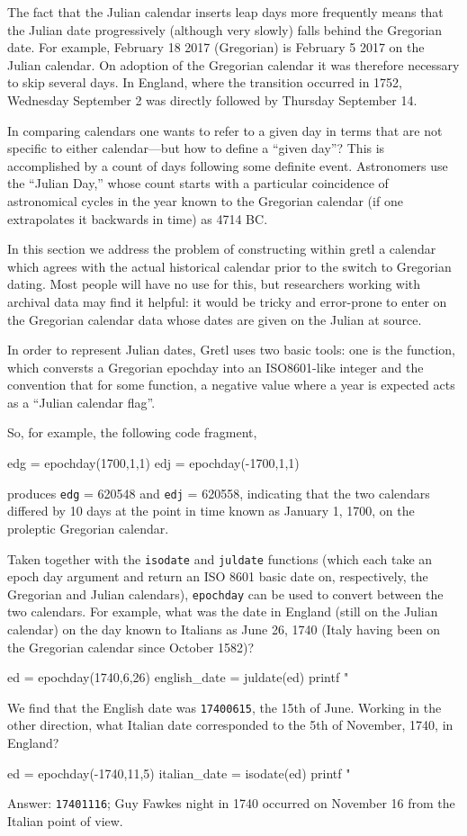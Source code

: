 The fact that the Julian calendar inserts leap days more frequently
means that the Julian date progressively (although very slowly) falls
behind the Gregorian date. For example, February 18 2017 (Gregorian)
is February 5 2017 on the Julian calendar. On adoption of the
Gregorian calendar it was therefore necessary to skip several days. In
England, where the transition occurred in 1752, Wednesday September 2
was directly followed by Thursday September 14.

In comparing calendars one wants to refer to a given day in terms that
are not specific to either calendar---but how to define a ``given
day''? This is accomplished by a count of days following some definite
event. Astronomers use the ``Julian Day,'' whose count starts with a
particular coincidence of astronomical cycles in the year known to the
Gregorian calendar (if one extrapolates it backwards in time) as 4714
BC.

In this section we address the problem of constructing within gretl a
calendar which agrees with the actual historical calendar prior to
the switch to Gregorian dating. Most people will have no use for
this, but researchers working with archival data may find it helpful:
it would be tricky and error-prone to enter on the Gregorian calendar
data whose dates are given on the Julian at source.

In order to represent Julian dates, Gretl uses two basic tools: one is
the  function, which conversts a Gregorian epochday into
an ISO8601-like integer and the convention that for some function,
a negative value where a year is expected acts as a ``Julian calendar
flag''.

So, for example, the following code fragment,
%
\begin{code}
edg = epochday(1700,1,1)
edj = epochday(-1700,1,1)
\end{code}
%
produces \texttt{edg} = 620548 and \texttt{edj} = 620558, indicating
that the two calendars differed by 10 days at the point in time
known as January 1, 1700, on the proleptic Gregorian calendar.

Taken together with the \texttt{isodate} and \texttt{juldate}
functions (which each take an epoch day argument and return an ISO
8601 basic date on, respectively, the Gregorian and Julian calendars),
\texttt{epochday} can be used to convert between the two calendars.
For example, what was the date in England (still on the Julian
calendar) on the day known to Italians as June 26, 1740 (Italy having
been on the Gregorian calendar since October 1582)?
%
\begin{code}
ed = epochday(1740,6,26)
english_date = juldate(ed)
printf "%
\end{code}
%
We find that the English date was \texttt{17400615}, the 15th of June.
Working in the other direction, what Italian date corresponded to the
5th of November, 1740, in England?
%
\begin{code}
ed = epochday(-1740,11,5)
italian_date = isodate(ed)
printf "%
\end{code}
%
Answer: \texttt{17401116}; Guy Fawkes night in 1740 occurred on 
November 16 from the Italian point of view.

